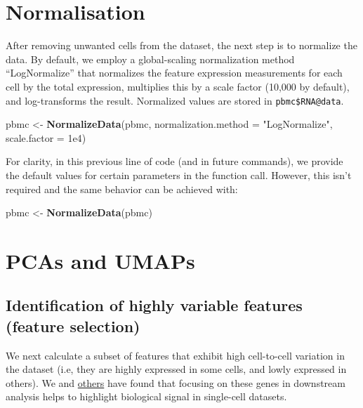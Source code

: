 \documentclass[
]{book}
\newenvironment{Shaded}{\begin{snugshade}}{\end{snugshade}}
\newcommand{\AttributeTok}[1]{\textcolor[rgb]{0.13,0.29,0.53}{#1}}
\newcommand{\FloatTok}[1]{\textcolor[rgb]{0.00,0.00,0.81}{#1}}
\newcommand{\FunctionTok}[1]{\textcolor[rgb]{0.13,0.29,0.53}{\textbf{#1}}}
\newcommand{\NormalTok}[1]{#1}
\newcommand{\OtherTok}[1]{\textcolor[rgb]{0.56,0.35,0.01}{#1}}
\newcommand{\StringTok}[1]{\textcolor[rgb]{0.31,0.60,0.02}{#1}}
\begin{document}
\hypertarget{norm}{%
\chapter{Normalisation}\label{norm}}

After removing unwanted cells from the dataset, the next step is to normalize the data. By default, we employ a global-scaling normalization method ``LogNormalize'' that normalizes the feature expression measurements for each cell by the total expression, multiplies this by a scale factor (10,000 by default), and log-transforms the result. Normalized values are stored in \texttt{pbmc\$RNA@data}.

\begin{Shaded}
\begin{Highlighting}[]
\NormalTok{pbmc }\OtherTok{\textless{}{-}} \FunctionTok{NormalizeData}\NormalTok{(pbmc, }\AttributeTok{normalization.method =} \StringTok{"LogNormalize"}\NormalTok{, }\AttributeTok{scale.factor =} \FloatTok{1e4}\NormalTok{)}
\end{Highlighting}
\end{Shaded}

For clarity, in this previous line of code (and in future commands), we provide the default values for certain parameters in the function call. However, this isn't required and the same behavior can be achieved with:

\begin{Shaded}
\begin{Highlighting}[]
\NormalTok{pbmc }\OtherTok{\textless{}{-}} \FunctionTok{NormalizeData}\NormalTok{(pbmc)}
\end{Highlighting}
\end{Shaded}

\hypertarget{reducedims}{%
\chapter{PCAs and UMAPs}\label{reducedims}}

\hypertarget{identification-of-highly-variable-features-feature-selection}{%
\section{Identification of highly variable features (feature selection)}\label{identification-of-highly-variable-features-feature-selection}}

We next calculate a subset of features that exhibit high cell-to-cell variation in the dataset (i.e, they are highly expressed in some cells, and lowly expressed in others). We and \href{https://www.nature.com/articles/nmeth.2645}{others} have found that focusing on these genes in downstream analysis helps to highlight biological signal in single-cell datasets.
\end{document}
